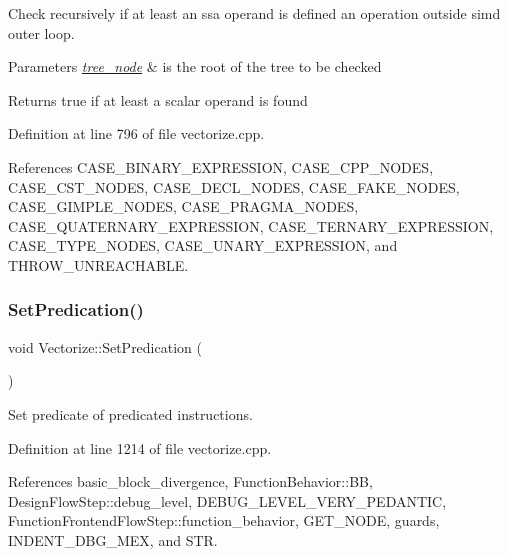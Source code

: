 Check recursively if at least an ssa operand is defined an operation outside simd outer loop. 


\begin{DoxyParams}{Parameters}
{\em \hyperlink{classtree__node}{tree\+\_\+node}} & is the root of the tree to be checked \\
\hline
\end{DoxyParams}
\begin{DoxyReturn}{Returns}
true if at least a scalar operand is found 
\end{DoxyReturn}


Definition at line 796 of file vectorize.\+cpp.



References C\+A\+S\+E\+\_\+\+B\+I\+N\+A\+R\+Y\+\_\+\+E\+X\+P\+R\+E\+S\+S\+I\+ON, C\+A\+S\+E\+\_\+\+C\+P\+P\+\_\+\+N\+O\+D\+ES, C\+A\+S\+E\+\_\+\+C\+S\+T\+\_\+\+N\+O\+D\+ES, C\+A\+S\+E\+\_\+\+D\+E\+C\+L\+\_\+\+N\+O\+D\+ES, C\+A\+S\+E\+\_\+\+F\+A\+K\+E\+\_\+\+N\+O\+D\+ES, C\+A\+S\+E\+\_\+\+G\+I\+M\+P\+L\+E\+\_\+\+N\+O\+D\+ES, C\+A\+S\+E\+\_\+\+P\+R\+A\+G\+M\+A\+\_\+\+N\+O\+D\+ES, C\+A\+S\+E\+\_\+\+Q\+U\+A\+T\+E\+R\+N\+A\+R\+Y\+\_\+\+E\+X\+P\+R\+E\+S\+S\+I\+ON, C\+A\+S\+E\+\_\+\+T\+E\+R\+N\+A\+R\+Y\+\_\+\+E\+X\+P\+R\+E\+S\+S\+I\+ON, C\+A\+S\+E\+\_\+\+T\+Y\+P\+E\+\_\+\+N\+O\+D\+ES, C\+A\+S\+E\+\_\+\+U\+N\+A\+R\+Y\+\_\+\+E\+X\+P\+R\+E\+S\+S\+I\+ON, and T\+H\+R\+O\+W\+\_\+\+U\+N\+R\+E\+A\+C\+H\+A\+B\+LE.

\mbox{\label{classVectorize_ac12fc968628410acaa5e3dd126907021}} 
\subsubsection{\texorpdfstring{Set\+Predication()}{SetPredication()}}
{\footnotesize\ttfamily void Vectorize\+::\+Set\+Predication (\begin{DoxyParamCaption}{ }\end{DoxyParamCaption})\hspace{0.3cm}{\ttfamily [private]}}



Set predicate of predicated instructions. 



Definition at line 1214 of file vectorize.\+cpp.



References basic\+\_\+block\+\_\+divergence, Function\+Behavior\+::\+BB, Design\+Flow\+Step\+::debug\+\_\+level, D\+E\+B\+U\+G\+\_\+\+L\+E\+V\+E\+L\+\_\+\+V\+E\+R\+Y\+\_\+\+P\+E\+D\+A\+N\+T\+IC, Function\+Frontend\+Flow\+Step\+::function\+\_\+behavior, G\+E\+T\+\_\+\+N\+O\+DE, guards, I\+N\+D\+E\+N\+T\+\_\+\+D\+B\+G\+\_\+\+M\+EX, and S\+TR.



